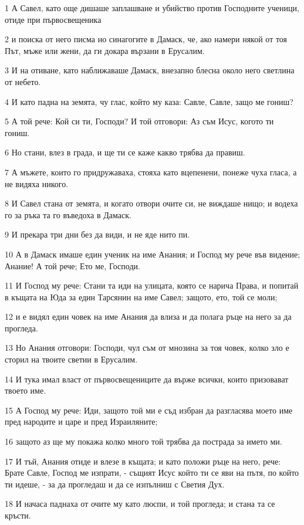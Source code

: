 \par 1 А Савел, като още дишаше заплашване и убийство против Господните ученици, отиде при първосвещеника
\par 2 и поиска от него писма но синагогите в Дамаск, че, ако намери някой от тоя Път, мъже или жени, да ги докара вързани в Ерусалим.
\par 3 И на отиване, като наближаваше Дамаск, внезапно блесна около него светлина от небето.
\par 4 И като падна на земята, чу глас, който му каза: Савле, Савле, защо ме гониш?
\par 5 А той рече: Кой си ти, Господи? И той отговори: Аз съм Исус, когото ти гониш.
\par 6 Но стани, влез в града, и ще ти се каже какво трябва да правиш.
\par 7 А мъжете, които го придружаваха, стояха като вцепенени, понеже чуха гласа, а не видяха никого.
\par 8 И Савел стана от земята, и когато отвори очите си, не виждаше нищо; и водеха го за ръка та го въведоха в Дамаск.
\par 9 И прекара три дни без да види, и не яде нито пи.
\par 10 А в Дамаск имаше един ученик на име Анания; и Господ му рече във видение; Анание! А той рече; Ето ме, Господи.
\par 11 И Господ му рече: Стани та иди на улицата, която се нарича Права, и попитай в къщата на Юда за един Тарсянин на име Савел; защото, ето, той се моли;
\par 12 и е видял един човек на име Анания да влиза и да полага ръце на него за да прогледа.
\par 13 Но Анания отговори: Господи, чул съм от мнозина за тоя човек, колко зло е сторил на твоите светии в Ерусалим.
\par 14 И тука имал власт от първосвещениците да върже всички, които призовават твоето име.
\par 15 А Господ му рече: Иди, защото той ми е съд избран да разгласява моето име пред народите и царе и пред Израиляните;
\par 16 защото аз ще му покажа колко много той трябва да пострада за името ми.
\par 17 И тъй, Анания отиде и влезе в къщата; и като положи ръце на него, рече: Брате Савле, Господ ме изпрати, - същият Исус който ти се яви на пътя, по който ти идеше, - за да прогледаш и да се изпълниш с Светия Дух.
\par 18 И начаса паднаха от очите му като люспи, и той прогледа; и стана та се кръсти.
